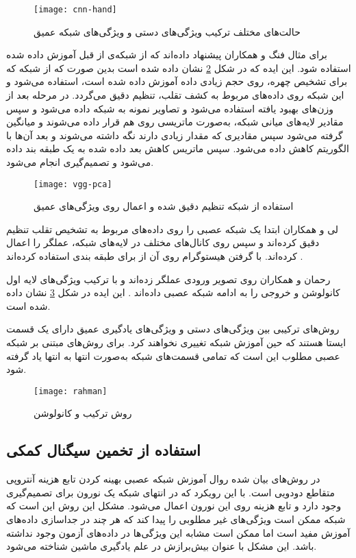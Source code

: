 \begin{figure}[hb]
	\centerline{\texttt{[image: cnn-hand]}}
	\caption{حالت‌های مختلف ترکیب ویژگی‌های دستی و ویژگی‌های شبکه عمیق \cite{yu2021deep}}
	\label{fig:cnn-hand}
\end{figure}

برای مثال فنگ و همکاران 
\cite{li2016original} 
پیشنهاد داده‌اند که از شبکه‌ی از قبل آموزش داده شده استفاده شود. 
این ایده که در شکل 
\ref{fig:vgg-pca}
 نشان داده شده است
بدین صورت که از شبکه
  \cite{parkhi2015deep}
 که برای تشخیص چهره، روی حجم زیادی داده آموزش داده شده است، استفاده می‌شود و این شبکه روی داده‌های مربوط به کشف تقلب، تنظیم دقیق
  می‌گردد. در مرحله بعد از وزن‌های بهبود یافته استفاده می‌شود و تصاویر نمونه به شبکه داده می‌شود و سپس مقادیر لایه‌های میانی شبکه، به‌صورت ماتریسی روی هم قرار داده می‌شوند و میانگین گرفته می‌شود سپس مقادیری که مقدار زیادی دارند نگه داشته می‌شوند و بعد آن‌ها با الگوریتم  کاهش داده می‌شود. سپس ماتریس کاهش بعد داده شده به یک طبقه بند  داده می‌شود و تصمیم‌گیری انجام می‌شود. 
\begin{figure}[h]
	\centerline{\texttt{[image: vgg-pca]}}
	\caption{استفاده از شبکه تنظیم دقیق شده و اعمال
		روی ویژگی‌های عمیق
		\cite{li2016original}}
	\label{fig:vgg-pca}
\end{figure}

لی و همکاران ابتدا یک شبکه عصبی
را روی داده‌های مربوط به تشخیص تقلب تنظیم دقیق کرده‌اند و سپس روی کانال‌های مختلف در لایه‌های شبکه، عملگر  را اعمال کرده‌اند. با گرفتن هیستوگرام روی آن از  برای طبقه بندی استفاده کرده‌اند
\cite{li2019face}.


رحمان و همکاران روی تصویر ورودی عملگر  زده‌اند و با ترکیب ویژگی‌های لایه اول کانولوشن و خروجی  را به ادامه شبکه عصبی داده‌اند
\cite{rehman2020enhancing}. 
 این ایده در شکل
\ref{fig:rahman}
نشان داده شده است.

روش‌های ترکیبی بین ویژگی‌های دستی و ویژگی‌های یادگیری عمیق دارای یک قسمت ایستا هستند که حین آموزش شبکه تغییری نخواهند کرد. برای روش‌های مبتنی بر شبکه عصبی مطلوب این است که تمامی قسمت‌های شبکه به‌صورت انتها به انتها یاد گرفته شود.
\begin{figure}[hb]
	\centerline{\texttt{[image: rahman]}}
	\caption{روش ترکیب  و کانولوشن \cite{rehman2020enhancing}}
	\label{fig:rahman}
\end{figure}

\subsection{استفاده از تخمین سیگنال کمکی}
در روش‌های بیان شده روال آموزش شبکه عصبی بهینه کردن تابع هزینه آنتروپی متقاطع دودویی
 است. با این رویکرد که در انتهای شبکه یک نورون برای تصمیم‌گیری وجود دارد و تابع هزینه روی این نورون اعمال می‌شود. مشکل این روش این است که شبکه ممکن است ویژگی‌های غیر مطلوبی را پیدا کند که هر چند در جداسازی داده‌های آموزش مفید است اما ممکن است مشابه این ویژگی‌ها در داده‌های آزمون وجود نداشته باشد. این مشکل با عنوان بیش‌برازش
  در علم یادگیری ماشین شناخته می‌شود.

